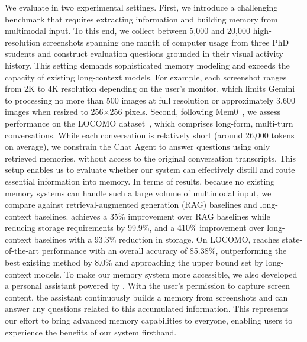 We evaluate \ours in two experimental settings. First, we introduce a challenging benchmark that requires extracting information and building memory from multimodal input. To this end, we collect between 5,000 and 20,000 high-resolution screenshots spanning one month of computer usage from three PhD students and construct evaluation questions grounded in their visual activity history. This setting demands sophisticated memory modeling and exceeds the capacity of existing long-context models. For example, each screenshot ranges from 2K to 4K resolution depending on the user's monitor, which limits Gemini to processing no more than 500 images at full resolution or approximately 3,600 images when resized to 256×256 pixels. Second, following Mem0~\citep{mem0}, we assess performance on the LOCOMO dataset~\citep{locomo}, which comprises long-form, multi-turn conversations. While each conversation is relatively short (around 26,000 tokens on average), we constrain the Chat Agent to answer questions using only retrieved memories, without access to the original conversation transcripts. This setup enables us to evaluate whether our system can effectively distill and route essential information into memory. In terms of results, because no existing memory systems can handle such a large volume of multimodal input, we compare against retrieval-augmented generation (RAG) baselines and long-context baselines. \ours achieves a 35\% improvement over RAG baselines while reducing storage requirements by 99.9\%, and a 410\% improvement over long-context baselines with a 93.3\% reduction in storage. On LOCOMO, \ours reaches state-of-the-art performance with an overall accuracy of 85.38\%, outperforming the best existing method by 8.0\% and approaching the upper bound set by long-context models. 
To make our memory system more accessible, we also developed a personal assistant powered by \ours. With the user’s permission to capture screen content, the assistant continuously builds a memory from screenshots and can answer any questions related to this accumulated information. This represents our effort to bring advanced memory capabilities to everyone, enabling users to experience the benefits of our system firsthand.

